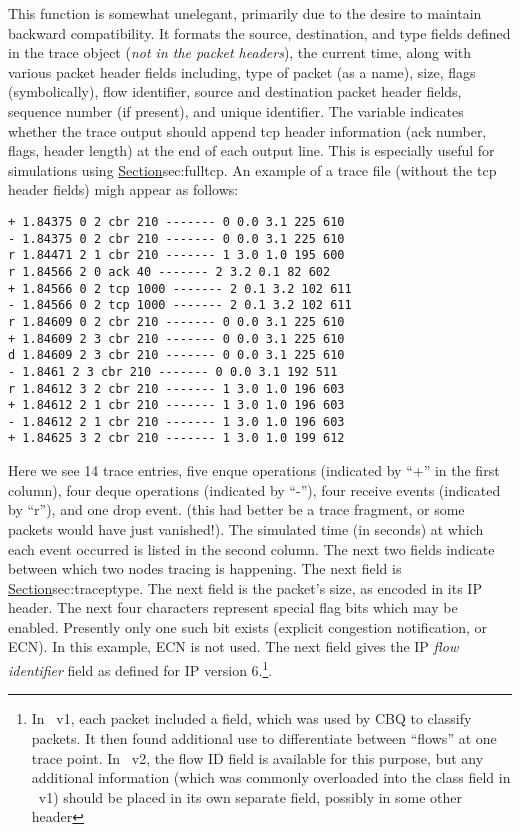 This function is somewhat unelegant, primarily due to the desire
to maintain backward compatibility.
It formats the source, destination, and type fields defined in the
trace object ({\em not in the packet headers}), the current time,
along with various packet header fields including,
type of packet (as a name), size, flags (symbolically),
flow identifier, source and destination packet header fields,
sequence number (if present), and unique identifier.
The  variable indicates whether the trace
output should append tcp header information (ack number, flags, header length)
at the end of each output line.
This is especially useful for simulations using
\href{FullTCP agents}{Section}{sec:fulltcp}.
An example of a trace file (without the tcp header fields) migh
appear as follows: 
\begin{small}
\begin{verbatim}
+ 1.84375 0 2 cbr 210 ------- 0 0.0 3.1 225 610
- 1.84375 0 2 cbr 210 ------- 0 0.0 3.1 225 610
r 1.84471 2 1 cbr 210 ------- 1 3.0 1.0 195 600
r 1.84566 2 0 ack 40 ------- 2 3.2 0.1 82 602
+ 1.84566 0 2 tcp 1000 ------- 2 0.1 3.2 102 611
- 1.84566 0 2 tcp 1000 ------- 2 0.1 3.2 102 611
r 1.84609 0 2 cbr 210 ------- 0 0.0 3.1 225 610
+ 1.84609 2 3 cbr 210 ------- 0 0.0 3.1 225 610
d 1.84609 2 3 cbr 210 ------- 0 0.0 3.1 225 610
- 1.8461 2 3 cbr 210 ------- 0 0.0 3.1 192 511
r 1.84612 3 2 cbr 210 ------- 1 3.0 1.0 196 603
+ 1.84612 2 1 cbr 210 ------- 1 3.0 1.0 196 603
- 1.84612 2 1 cbr 210 ------- 1 3.0 1.0 196 603
+ 1.84625 3 2 cbr 210 ------- 1 3.0 1.0 199 612
\end{verbatim}
\end{small}
Here we see 14 trace entries, five enque operations (indicated by ``+''
in the first column), four deque operations (indicated by ``-''),
four receive events (indicated by ``r''), and one drop event.
(this had better be a trace fragment, or
some packets would have just vanished!).
The simulated time (in seconds) at which each event occurred is listed
in the second column.
The next two fields indicate between which two nodes tracing is happening.
The next field is 
\href{a descriptive name for the the type of packet seen}{Section}{sec:traceptype}.
The next field is the packet's size, as encoded in its IP header.
The next four characters represent special flag bits which may be
enabled.  Presently only one such bit exists (explicit congestion
notification, or {\sf ECN}).  In this example, {\sf ECN} is not used.
The next field gives the IP {\em flow identifier} field as defined
for IP version 6.\footnote{In \ns~v1, each packet included a 
field, which was used by CBQ to classify packets.
It then found additional use to differentiate between
``flows'' at one trace point.  In \ns~v2, the flow ID field is available
for this purpose, but any additional information (which was commonly overloaded
into the class field in \ns~v1) should be placed in its own separate field,
possibly in some other header}.
